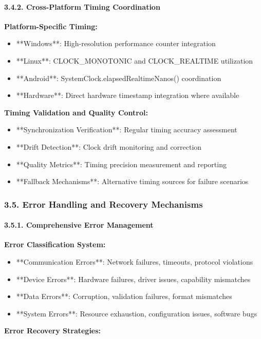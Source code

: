 \documentclass[12pt,a4paper]{article}
\begin{document}
\paragraph{3.4.2. Cross-Platform Timing Coordination}

\textbf{Platform-Specific Timing:}

\begin{itemize}
\item **Windows**: High-resolution performance counter integration
\item **Linux**: CLOCK_MONOTONIC and CLOCK_REALTIME utilization
\item **Android**: SystemClock.elapsedRealtimeNanos() coordination
\item **Hardware**: Direct hardware timestamp integration where available

\end{itemize}
\textbf{Timing Validation and Quality Control:}

\begin{itemize}
\item **Synchronization Verification**: Regular timing accuracy assessment
\item **Drift Detection**: Clock drift monitoring and correction
\item **Quality Metrics**: Timing precision measurement and reporting
\item **Fallback Mechanisms**: Alternative timing sources for failure scenarios

\end{itemize}
\subsubsection{3.5. Error Handling and Recovery Mechanisms}

\paragraph{3.5.1. Comprehensive Error Management}

\textbf{Error Classification System:}

\begin{itemize}
\item **Communication Errors**: Network failures, timeouts, protocol violations
\item **Device Errors**: Hardware failures, driver issues, capability mismatches
\item **Data Errors**: Corruption, validation failures, format mismatches
\item **System Errors**: Resource exhaustion, configuration issues, software bugs

\end{itemize}
\textbf{Error Recovery Strategies:}
\end{document}
